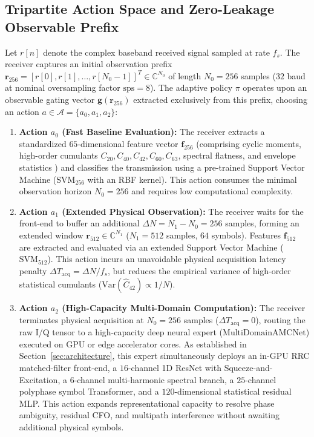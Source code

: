 \subsection{Tripartite Action Space and Zero-Leakage Observable Prefix}
\label{subsec:action_space}

Let $r[n]$ denote the complex baseband received signal sampled at rate $f_s$. The receiver captures an initial observation prefix $\mathbf{r}_{256} = [r[0], r[1], \dots, r[N_0-1]]^T \in \mathbb{C}^{N_0}$ of length $N_0 = 256$ samples ($32$ baud at nominal oversampling factor $\mathrm{sps} = 8$). The adaptive policy $\pi$ operates upon an observable gating vector $\mathbf{g}(\mathbf{r}_{256})$ extracted exclusively from this prefix, choosing an action $a \in \mathcal{A} = \{a_0, a_1, a_2\}$:

\begin{enumerate}
    \item \textbf{Action $a_0$ (Fast Baseline Evaluation):} The receiver extracts a standardized $65$-dimensional feature vector $\mathbf{f}_{256}$ (comprising cyclic moments, high-order cumulants $C_{20}, C_{40}, C_{42}, C_{60}, C_{63}$, spectral flatness, and envelope statistics \cite{xia2026optimal}) and classifies the transmission using a pre-trained Support Vector Machine ($\mathrm{SVM}_{256}$ with an RBF kernel). This action consumes the minimal observation horizon $N_0 = 256$ and requires low computational complexity.
    
    \item \textbf{Action $a_1$ (Extended Physical Observation):} The receiver waits for the front-end to buffer an additional $\Delta N = N_1 - N_0 = 256$ samples, forming an extended window $\mathbf{r}_{512} \in \mathbb{C}^{N_1}$ ($N_1 = 512$ samples, $64$ symbols). Features $\mathbf{f}_{512}$ are extracted and evaluated via an extended Support Vector Machine ($\mathrm{SVM}_{512}$). This action incurs an unavoidable physical acquisition latency penalty $\Delta T_{\mathrm{acq}} = \Delta N / f_s$, but reduces the empirical variance of high-order statistical cumulants ($\mathrm{Var}(\hat{C}_{42}) \propto 1/N$).
    
    \item \textbf{Action $a_2$ (High-Capacity Multi-Domain Computation):} The receiver terminates physical acquisition at $N_0 = 256$ samples ($\Delta T_{\mathrm{acq}} = 0$), routing the raw I/Q tensor to a high-capacity deep neural expert ($\mathrm{MultiDomainAMCNet}$) executed on GPU or edge accelerator cores. As established in Section~\ref{sec:architecture}, this expert simultaneously deploys an in-GPU RRC matched-filter front-end, a $16$-channel 1D ResNet with Squeeze-and-Excitation, a $6$-channel multi-harmonic spectral branch, a $25$-channel polyphase symbol Transformer, and a $120$-dimensional statistical residual MLP. This action expands representational capacity to resolve phase ambiguity, residual CFO, and multipath interference without awaiting additional physical symbols.
\end{enumerate}

